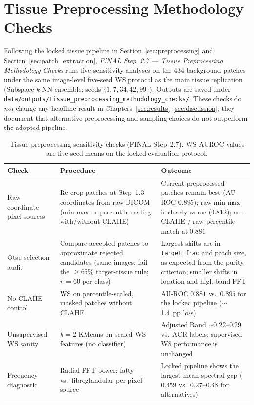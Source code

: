 \chapter{Tissue Preprocessing Methodology Checks} \label{app:tissue_methodology}

Following the locked tissue pipeline in Section~\ref{sec:preprocessing} and Section~\ref{sec:patch_extraction}, \textit{FINAL Step~2.7 --- Tissue Preprocessing Methodology Checks} runs five sensitivity analyses on the 434 background patches under the same image-level five-seed WS protocol as the main tissue replication (Subspace $k$-NN ensemble; seeds $\{1,7,34,42,99\}$). Outputs are saved under \texttt{data/outputs/tissue\_preprocessing\_methodology\_checks/}. These checks do \emph{not} change any headline result in Chapters~\ref{sec:results}--\ref{sec:discussion}; they document that alternative preprocessing and sampling choices do not outperform the adopted pipeline.

\begin{table}[h]
\centering
\caption[Tissue preprocessing sensitivity checks]{Tissue preprocessing sensitivity checks (FINAL Step~2.7). WS AUROC values are five-seed means on the locked evaluation protocol.}
\label{tab:tissue_methodology_checks}
\small
\begin{tabular}{p{3.2cm}p{4.8cm}p{4.6cm}}
\toprule
\textbf{Check} & \textbf{Procedure} & \textbf{Outcome} \\
\midrule
Raw-coordinate pixel sources &
Re-crop patches at Step~1.3 coordinates from raw DICOM (min-max or percentile scaling, with/without CLAHE) &
Current preprocessed patches remain best (AU-ROC $0.895$); raw min-max is clearly worse ($0.812$); no-CLAHE / raw percentile match at $0.881$ \\
Otsu-selection audit &
Compare accepted patches to approximate rejected candidates (same images; fail the $\ge$65\% target-tissue rule; $n=60$ per class) &
Largest shifts are in \texttt{target\_frac} and patch size, as expected from the purity criterion; smaller shifts in location and high-band FFT \\
No-CLAHE control &
WS on percentile-scaled, masked patches without CLAHE &
AU-ROC $0.881$ vs.\ $0.895$ for the locked pipeline (${\sim}$1.4~pp loss) \\
Unsupervised WS sanity &
$k=2$ KMeans on scaled WS features (no classifier) &
Adjusted Rand ${\sim}0.22$--$0.29$ vs.\ ACR labels; supervised WS performance is unchanged \\
Frequency diagnostic &
Radial FFT power: fatty vs.\ fibroglandular per pixel source &
Locked pipeline shows the largest mean spectral gap ($0.459$ vs.\ $0.27$--$0.38$ for alternatives) \\
\bottomrule
\end{tabular}
\end{table}

